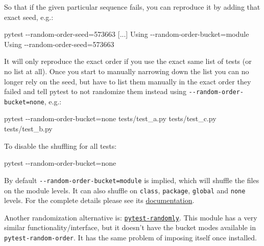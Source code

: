 \documentclass[
]{report}
\newenvironment{Shaded}{\begin{snugshade}}{\end{snugshade}}
\newcommand{\AttributeTok}[1]{\textcolor[rgb]{0.40,0.45,0.13}{#1}}
\newcommand{\ExtensionTok}[1]{\textcolor[rgb]{0.00,0.23,0.31}{#1}}
\newcommand{\NormalTok}[1]{\textcolor[rgb]{0.00,0.23,0.31}{#1}}
\newcommand{\OperatorTok}[1]{\textcolor[rgb]{0.37,0.37,0.37}{#1}}
\begin{document}
So that if the given particular sequence fails, you can reproduce it by
adding that exact seed, e.g.:

\begin{Shaded}
\begin{Highlighting}[]
\ExtensionTok{pytest} \AttributeTok{{-}{-}random{-}order{-}seed}\OperatorTok{=}\NormalTok{573663}
\ExtensionTok{[...]}
\ExtensionTok{Using} \AttributeTok{{-}{-}random{-}order{-}bucket}\OperatorTok{=}\NormalTok{module}
\ExtensionTok{Using} \AttributeTok{{-}{-}random{-}order{-}seed}\OperatorTok{=}\NormalTok{573663}
\end{Highlighting}
\end{Shaded}

It will only reproduce the exact order if you use the exact same list of
tests (or no list at all). Once you start to manually narrowing down the
list you can no longer rely on the seed, but have to list them manually
in the exact order they failed and tell pytest to not randomize them
instead using \texttt{-\/-random-order-bucket=none}, e.g.:

\begin{Shaded}
\begin{Highlighting}[]
\ExtensionTok{pytest} \AttributeTok{{-}{-}random{-}order{-}bucket}\OperatorTok{=}\NormalTok{none tests/test\_a.py tests/test\_c.py tests/test\_b.py}
\end{Highlighting}
\end{Shaded}

To disable the shuffling for all tests:

\begin{Shaded}
\begin{Highlighting}[]
\ExtensionTok{pytest} \AttributeTok{{-}{-}random{-}order{-}bucket}\OperatorTok{=}\NormalTok{none}
\end{Highlighting}
\end{Shaded}

By default \texttt{-\/-random-order-bucket=module} is implied, which
will shuffle the files on the module levels. It can also shuffle on
\texttt{class}, \texttt{package}, \texttt{global} and \texttt{none}
levels. For the complete details please see its
\href{https://github.com/jbasko/pytest-random-order}{documentation}.

Another randomization alternative is:
\href{https://github.com/pytest-dev/pytest-randomly}{\texttt{pytest-randomly}}.
This module has a very similar functionality/interface, but it doesn't
have the bucket modes available in \texttt{pytest-random-order}. It has
the same problem of imposing itself once installed.
\end{document}
